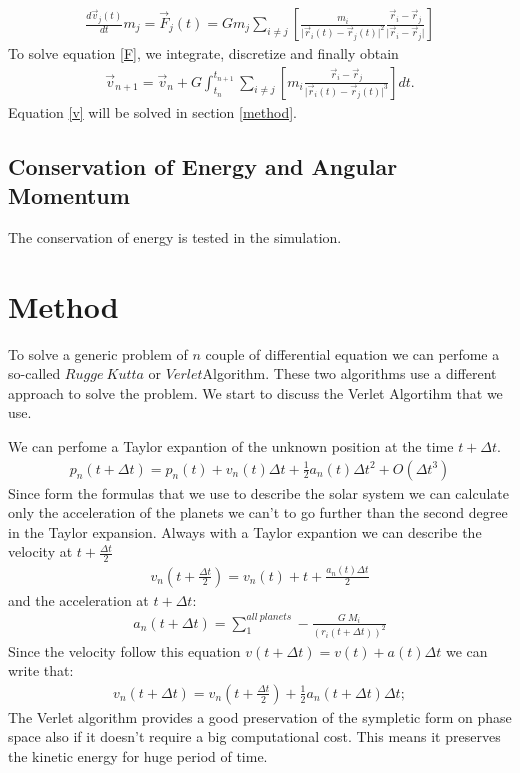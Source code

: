 \documentclass[a4paper]{article}
\begin{document}
\begin{align} \label{F}
\frac{d \vec{v}_j(t)}{dt} m_j = \vec{F}_j(t) = G m_j \sum \limits_{i \neq j} \left[ \frac{m_i}{\lvert \vec{r}_i(t)-\vec{r}_j(t) \lvert ^2} \frac{\vec{r}_i-\vec{r}_j}{\lvert \vec{r}_i-\vec{r}_j \lvert} \right]
\end{align}
To solve equation \ref{F}, we integrate, discretize and finally obtain
\begin{align}\label{v}
\vec{v}_{n+1} = \vec{v}_n +  G \int_{t_n}^{t_{n+1}} \sum \limits_{i \neq j} \left[ m_i \frac{\vec{r}_i-\vec{r}_j}{\lvert \vec{r}_i(t)-\vec{r}_j(t) \lvert ^3} \right] dt.
\end{align}
Equation \ref{v} will be solved in section \ref{method}.






\subsection{Conservation of Energy and Angular Momentum}\label{energyc}

The conservation of energy is tested in the simulation.


 
 
 
\section{Method}
To solve a generic problem of $n$ couple of differential equation we can perfome a so-called $Rugge \ Kutta$ or $Verlet $Algorithm. These two algorithms use a different approach to solve the problem. We start to discuss the Verlet Algortihm that we use. 

We can perfome a Taylor expantion of the unknown position at the time $t + \Delta t$.  
\begin{align}
p_n(t + \Delta t) = p_n(t) + v_n(t)\Delta t + \frac{1}{2}a_n(t)\Delta t^2  + O(\Delta t^3) 
\end{align}
Since form the formulas that we use to describe the solar system we can calculate only the acceleration of the planets we can't  to go further than the second degree in the Taylor expansion.
Always with a Taylor expantion we can describe the velocity at $t + \frac{\Delta t}{2}$ 
\begin{align}
v_n(t + \frac{\Delta t}{2}) = v_n(t) + t + \frac{a_n(t)\Delta t}{2} 
\end{align}
and the acceleration at $t + \Delta t$:
\begin{align}
a_n(t + \Delta t) = \sum_{1}^{all \ planets} - \frac{G \ M_i}{(r_i(t + \Delta t))^2}
\end{align}
Since the velocity follow this equation $v(t + \Delta t) = v(t) + a(t)\Delta t$ we can write that:
\begin{align}
v_n(t + \Delta t) = v_n(t + \frac{\Delta t}{2}) + \frac{1}{2}a_n(t+ \Delta t)\Delta t;
\end{align}
The Verlet algorithm provides a good preservation of the sympletic form on phase space also if it doesn't require a big computational cost. This means it preserves the kinetic energy for huge period of time. 
\end{document}
